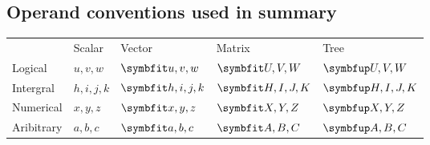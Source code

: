 \subsection{Operand conventions used in summary}
\begin{tabularx}{\textwidth}{ l l l l l }
	& Scalar
	& Vector
	& Matrix
	& Tree
	\\
Logical
	& \( u,v,w \)
	& \( \vect{u,v,w} \)
	& \( \mat{U,V,W} \)
	& \( \tree{U,V,W} \)
	\\
Intergral
	& \( h,i,j,k \)
	& \( \vect{h,i,j,k} \)
	& \( \mat{H,I,J,K} \)
	& \( \tree{H,I,J,K} \)
	\\
Numerical
	& \( x,y,z \)
	& \( \vect{x,y,z} \)
	& \( \mat{X,Y,Z} \)
	& \( \tree{X,Y,Z} \)
	\\
Aribitrary
	& \( a,b,c \)
	& \( \vect{a,b,c} \)
	& \( \mat{A,B,C} \)
	& \( \tree{A,B,C} \)
	\\
\end{tabularx}

